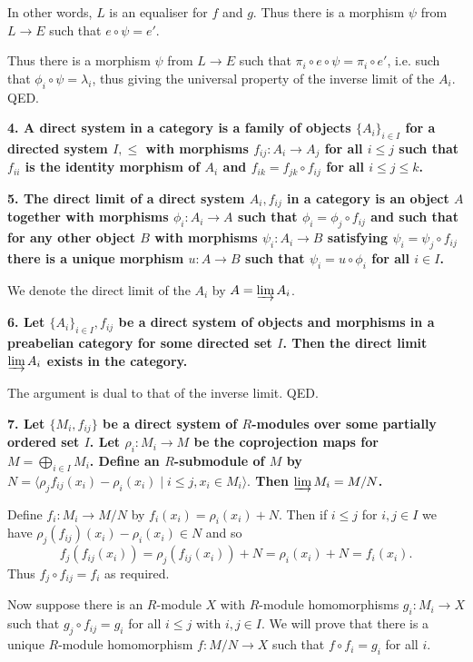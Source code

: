 \documentclass[12pt]{article}
\begin{document}
In other words, $L$ is an equaliser for $f$ and $g$. Thus there is a morphism $\psi$ from $L \to E$ such that $e\circ \psi = e'$.

Thus there is a morphism $\psi$ from $L \to E$ such that $\pi_i\circ e\circ \psi = \pi_i\circ e'$, i.e. such that $\phi_i\circ \psi = \lambda_i$, thus giving the universal property of the inverse limit of the $A_i$. QED.

\textbf{4. A direct system in a category is a family of objects $\{A_i\}_{i \in I}$ for a directed system $I, \leq$ with morphisms $f_{ij} : A_i \to A_j$ for all $i \leq j$ such that $f_{ii}$ is the identity morphism of $A_i$ and $f_{ik} = f_{jk}\circ f_{ij}$ for all $i \leq j \leq k$.}

\textbf{5. The direct limit of a direct system $A_i, f_{ij}$ in a category is an object $A$ together with morphisms $\phi_i : A_i \to A$ such that $\phi_i = \phi_j\circ f_{ij}$ and such that for any other object $B$ with morphisms $\psi_i : A_i \to B$ satisfying $\psi_i = \psi_j\circ f_{ij}$ there is a unique morphism $u : A \to B$ such that $\psi_i = u\circ \phi_i$ for all $i \in I$.}

We denote the direct limit of the $A_i$ by $A = \varinjlim A_i$.

\textbf{6. Let $\{A_i\}_{i\in I}, f_{ij}$ be a direct system of objects and morphisms in a preabelian category for some directed set $I$. Then the direct limit $\varinjlim A_i$ exists in the category.}

The argument is dual to that of the inverse limit. QED.

\textbf{7. Let $\{M_i, f_{ij}\}$ be a direct system of $R$-modules over some partially ordered set $I$. Let $\rho_i : M_i \to M$ be the coprojection maps for $M = \bigoplus_{i \in I} M_i$. Define an $R$-submodule of $M$ by $N = \langle \rho_j f_{ij}(x_i) - \rho_i(x_i) \;|\; i \leq j, x_i \in M_i\rangle.$ Then $\varinjlim M_i = M/N$.}

Define $f_i : M_i \to M/N$ by $f_i(x_i) = \rho_i(x_i) + N$. Then if $i \leq j$ for $i, j \in I$ we have $\rho_j(f_{ij})(x_i) - \rho_i(x_i) \in N$ and so
$$f_j(f_{ij}(x_i)) = \rho_j(f_{ij}(x_i)) + N = \rho_i(x_i) + N = f_i(x_i).$$
Thus $f_j\circ f_{ij} = f_i$ as required.

Now suppose there is an $R$-module $X$ with $R$-module homomorphisms $g_i : M_i \to X$ such that $g_j\circ f_{ij} = g_i$ for all $i \leq j$ with $i, j \in I$. We will prove that there is a unique $R$-module homomorphism $f : M/N \to X$ such that $f\circ f_i = g_i$ for all $i$.
\end{document}
